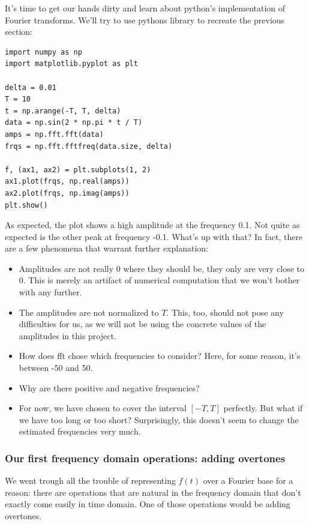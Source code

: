 It's time to get our hands dirty and learn about python's implementation of Fourier transforms. We'll try to use pythons  library to recreate the previous section: 

\begin{lstlisting}
import numpy as np
import matplotlib.pyplot as plt

delta = 0.01
T = 10
t = np.arange(-T, T, delta)
data = np.sin(2 * np.pi * t / T)
amps = np.fft.fft(data)
frqs = np.fft.fftfreq(data.size, delta)

f, (ax1, ax2) = plt.subplots(1, 2)
ax1.plot(frqs, np.real(amps))
ax2.plot(frqs, np.imag(amps))
plt.show()
\end{lstlisting}

As expected, the plot shows a high amplitude at the frequency 0.1. Not quite as expected is the other peak at frequency -0.1. What's up with that? In fact, there are a few phenomena that warrant further explanation: 

\begin{itemize}
    \item Amplitudes are not really 0 where they should be, they only are very close to 0. This is merely an artifact of numerical computation that we won't bother with any further. 
    \item The amplitudes are not normalized to $T$. This, too, should not pose any difficulties for us, as we will not be using the concrete values of the amplitudes in this project. 
    \item How does fft chose which frequencies to consider? Here, for some reason, it's between -50 and 50.
    \item Why are there positive and negative frequencies?
    \item For now, we have chosen  to cover the interval $[-T, T]$ perfectly. But what if we have  too long or too short? Surprisingly, this doesn't seem to change the estimated frequencies very much. 
\end{itemize}


\subsubsection{Our first frequency domain operations: adding overtones}

We went trough all the trouble of representing $f(t)$ over a Fourier base for a reason: there are operations that are natural in the frequency domain that don't exactly come easily in time domain. One of those operations would be adding overtones. 


